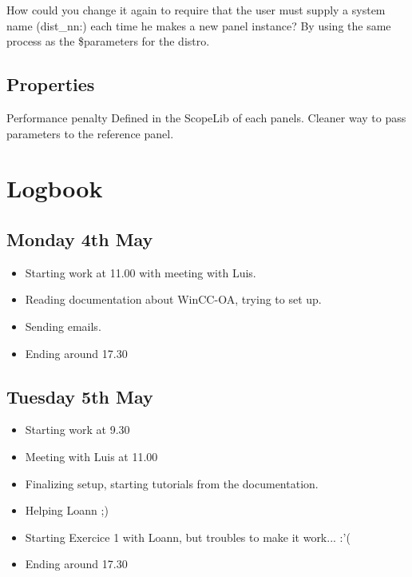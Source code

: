 \documentclass[a4paper, 10pt]{article}
\begin{document}
How could you change it again to require that the user must supply a system name (dist\_nn:) each time he makes a new panel instance?
By using the same process as the \$parameters for the distro.

\subsection{Properties}
Performance penalty
Defined in the ScopeLib of each panels.
Cleaner way to pass parameters to the reference panel.



\newpage

\section{Logbook}
\subsection*{Monday 4th May}
\begin{itemize}
    \item Starting work at 11.00 with meeting with Luis.
    \item Reading documentation about WinCC-OA, trying to set up.
    \item Sending emails.
    \item Ending around 17.30
\end{itemize}

\subsection*{Tuesday 5th May}
\begin{itemize}
    \item Starting work at 9.30
    \item Meeting with Luis at 11.00 
    \item Finalizing setup, starting tutorials from the documentation.
    \item Helping Loann ;)
    \item Starting Exercice 1 with Loann, but troubles to make it work... :'(
    \item Ending around 17.30
\end{itemize}
\end{document}
